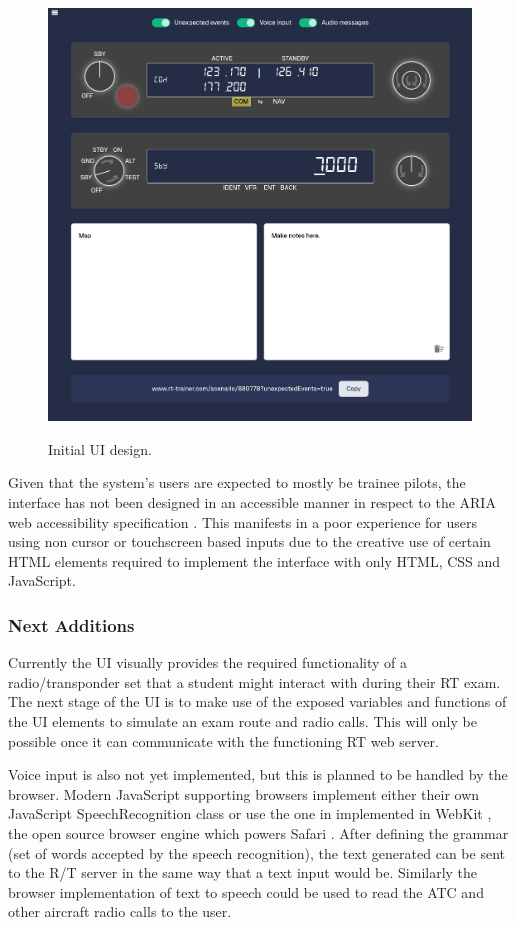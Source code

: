 \begin{figure}[H]
    \centering
	\includegraphics[scale = 0.47]{../document-resources/images/Project-Initial-UI.png}
    \label{initialui}
    \caption{Initial UI design.}
\end{figure}

Given that the system's users are expected to mostly be trainee pilots, the interface has not been designed in an accessible manner in respect to the ARIA web accessibility specification \cite{ARIA}. This manifests in a poor experience for users using non cursor or touchscreen based inputs due to the creative use of certain HTML elements required to implement the interface with only HTML, CSS and JavaScript.

\subsubsection{Next Additions}
Currently the UI visually provides the required functionality of a radio/transponder set that a student might interact with during their RT exam. The next stage of the UI is to make use of the exposed variables and functions of the UI elements to simulate an exam route and radio calls. This will only be possible once it can communicate with the functioning RT web server.

Voice input is also not yet implemented, but this is planned to be handled by the browser. Modern JavaScript supporting browsers implement either their own JavaScript SpeechRecognition class or use the one in implemented in WebKit \cite{MDNWebSpeech}, the open source browser engine which powers Safari \cite{WebKit}. After defining the grammar (set of words accepted by the speech recognition), the text generated can be sent to the R/T server in the same way that a text input would be. Similarly the browser implementation of text to speech could be used to read the ATC and other aircraft radio calls to the user.

